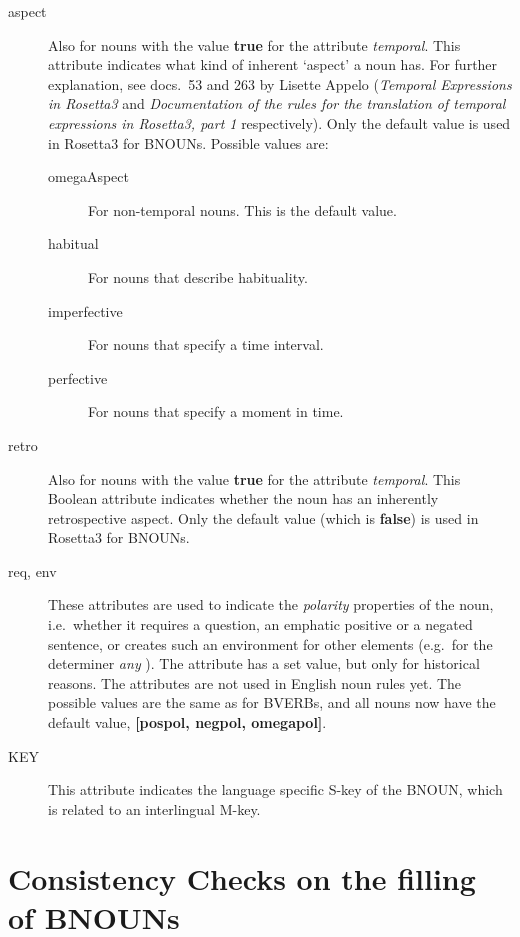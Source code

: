 \begin{description}
\item[aspect] Also for nouns with the value {\bf true} for 
the attribute {\em temporal\/}. This attribute indicates what
kind of inherent `aspect' a noun has. For further explanation, see docs.\ 53 and 263 
by 
Lisette Appelo ({\em Temporal Expressions in Rosetta3\/} and {\em Documentation 
of the rules for the translation of temporal expressions in Rosetta3, part 1\/} 
respectively). Only the default value is used in Rosetta3 for BNOUNs. Possible 
values are:
  \begin{description}
  \item[omegaAspect] For non-temporal nouns. This is the default value.  
  \item[habitual] For nouns that describe habituality.
  \item[imperfective] For nouns that specify a time interval.
  \item[perfective] For nouns that specify a moment in time.
  \end{description}

\item[retro] Also for nouns with the value {\bf true} for 
the attribute {\em temporal\/}. This Boolean attribute indicates 
whether the noun has an inherently retrospective aspect. Only the default value 
(which is {\bf false}) is used in Rosetta3 for BNOUNs.

\item[req, env] These attributes are used to indicate the 
    {\em  polarity\/} properties of the noun, i.e.\ whether it requires a 
    question, an emphatic positive or a negated sentence, or creates
    such an environment for other elements (e.g.\ for the determiner {\em any\/
}).
    The attribute has a set value, but only for historical reasons. 
    The attributes are not used in English noun rules yet. 
    The possible values are the same as for BVERBs, and all 
    nouns now have the default value, {\bf [pospol, negpol, omegapol]}.

\item[KEY] This attribute indicates the language specific S-key of the BNOUN, 
which is related to an interlingual M-key.

\end{description}

\newpage
\section{Consistency Checks on the filling of BNOUNs}

